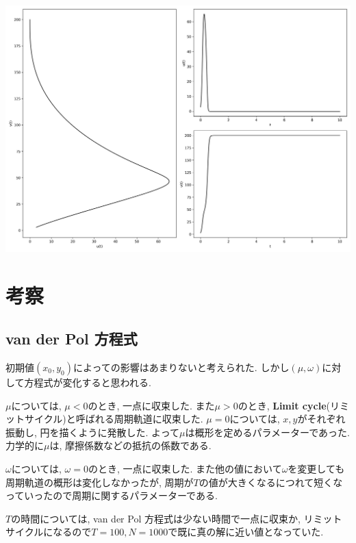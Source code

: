 \documentclass[12pt,a4paper]{jsarticle}
\makeatletter
\def\figcaption{\def\@captype{figure}\caption}
\makeatother
\begin{document}
\figcaption{$u_0=3.00, v_0=3.00, a_1=23.20, b_1=-0.60, c_1=-0.40, a_2=18.80, b_2=-0.50, c_2=-0.30, T = 10, N = 2000$}
\includegraphics[scale=0.33]{u3,0v3,0a125,0b1-0,1c1-0,4a220,0b2-0,2c2-0,1t1,00e+01n2,00e+03.png}
\figcaption{$u_0=3.00, v_0=3.00, a_1=25.00, b_1=-0.10, c_1=-0.40, a_2=20.00, b_2=-0.20, c_2=-0.10, T = 10, N = 2000$}

\section{考察}
\subsection{van der Pol 方程式}
初期値$(x_0, y_0)$によっての影響はあまりないと考えられた. しかし$(\mu, \omega)$に対して方程式が変化すると思われる.

$\mu$については, $\mu < 0$のとき, 一点に収束した. また$\mu > 0$のとき, \textbf{Limit cycle}(リミットサイクル)と呼ばれる周期軌道に収束した. $\mu = 0$については, $x, y$がそれぞれ振動し, 円を描くように発散した. よって$\mu$は概形を定めるパラメーターであった. 力学的に$\mu$は, 摩擦係数などの抵抗の係数である.

$\omega$については, $\omega = 0$のとき, 一点に収束した. また他の値において$\omega$を変更しても周期軌道の概形は変化しなかったが, 周期が$T$の値が大きくなるにつれて短くなっていったので周期に関するパラメーターである.

$T$の時間については, van der Pol 方程式は少ない時間で一点に収束か, リミットサイクルになるので$T = 100, N = 1000$で既に真の解に近い値となっていた.
\end{document}
